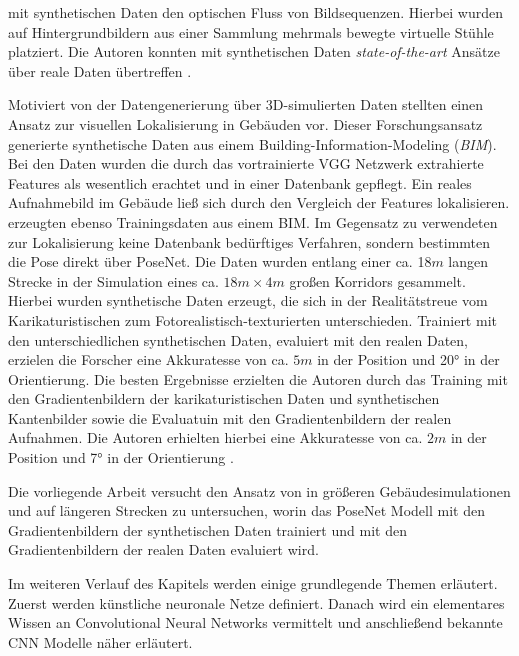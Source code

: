 mit synthetischen Daten den optischen Fluss von Bildsequenzen. Hierbei wurden auf Hintergrundbildern aus einer Sammlung mehrmals bewegte virtuelle Stühle platziert. Die Autoren konnten mit synthetischen Daten \textit{state-of-the-art} Ansätze über reale Daten übertreffen \cite{dosovitskiyFlowNetLearningOptical2015}.

Motiviert von der Datengenerierung über 3D-simulierten Daten stellten \citet{haImagebasedIndoorLocalization2018} einen Ansatz zur visuellen Lokalisierung in Gebäuden vor. Dieser Forschungsansatz generierte synthetische Daten aus einem Building-Information-Modeling (\textit{BIM}). Bei den Daten wurden die durch das vortrainierte VGG Netzwerk \cite{simonyanVeryDeepConvolutional2014} extrahierte Features als wesentlich erachtet und in einer Datenbank gepflegt. Ein reales Aufnahmebild im Gebäude ließ sich durch den Vergleich der Features lokalisieren. \citet{acharyaBIMPoseNetIndoorCamera2019} erzeugten ebenso Trainingsdaten aus einem BIM. Im Gegensatz zu \citet{haImagebasedIndoorLocalization2018} verwendeten \citet{acharyaBIMPoseNetIndoorCamera2019} zur Lokalisierung keine Datenbank bedürftiges Verfahren, sondern bestimmten die Pose direkt über PoseNet. Die Daten wurden entlang einer ca. 18$m$ langen Strecke in der Simulation eines ca. $18m \times 4m$ großen Korridors gesammelt. Hierbei wurden synthetische Daten erzeugt, die sich in der Realitätstreue vom Karikaturistischen zum Fotorealistisch-texturierten unterschieden. Trainiert mit den unterschiedlichen synthetischen Daten, evaluiert mit den realen Daten, erzielen die Forscher eine Akkuratesse von ca. $5m$ in der Position und 20° in der Orientierung.
Die besten Ergebnisse erzielten die Autoren durch das Training mit den Gradientenbildern der karikaturistischen Daten und synthetischen Kantenbilder sowie die Evaluatuin mit den Gradientenbildern der realen Aufnahmen. Die Autoren erhielten hierbei eine Akkuratesse von ca. $2m$ in der Position und 7° in der Orientierung \cite{acharyaBIMPoseNetIndoorCamera2019}.

Die vorliegende Arbeit versucht den Ansatz von \citet{acharyaBIMPoseNetIndoorCamera2019} in größeren Gebäudesimulationen und auf längeren Strecken zu untersuchen, worin das PoseNet Modell mit den Gradientenbildern der synthetischen Daten trainiert und mit den Gradientenbildern der realen Daten evaluiert wird.

Im weiteren Verlauf des Kapitels werden einige grundlegende Themen erläutert. Zuerst werden künstliche neuronale Netze definiert. Danach wird ein elementares Wissen an Convolutional Neural Networks vermittelt und anschließend bekannte CNN Modelle näher erläutert.

